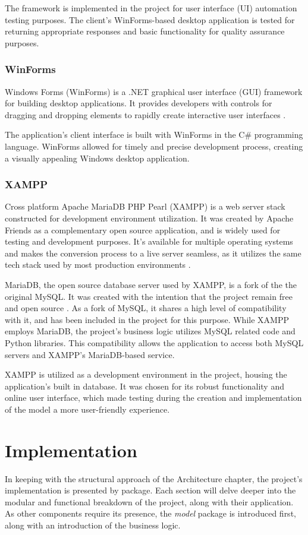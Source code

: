 \documentclass{thesis-ekf}
\theoremstyle{definition}
\theoremstyle{remark}
\begin{document}
The framework is implemented in the project for user interface (UI) automation testing purposes. The client's WinForms-based desktop application is tested for returning appropriate responses and basic functionality for quality assurance purposes.

\subsection{WinForms} \label{winform}
Windows Forms (WinForms) is a .NET graphical user interface (GUI) framework for building desktop applications. It provides developers with controls for dragging and dropping elements to rapidly create interactive user interfaces \cite{winforms}.

The application's client interface is built with WinForms in the C\# programming language. WinForms allowed for timely and precise development process, creating a visually appealing Windows desktop application.

\subsection{XAMPP}
Cross platform Apache MariaDB PHP Pearl (XAMPP) is a web server stack constructed for development environment utilization. It was created by Apache Friends as a complementary open source application, and is widely used for testing and development purposes. It's available for multiple operating systems and makes the conversion process to a live server seamless, as it utilizes the same tech stack used by most production environments \cite{wiki-xampp}.

MariaDB, the open source database server used by XAMPP, is a fork of the the original MySQL. It was created with the intention that the project remain free and open source \cite{mariaDB}. As a fork of MySQL, it shares a high level of compatibility with it, and has been included in the project for this purpose. While XAMPP employs MariaDB, the project's business logic utilizes MySQL related code and Python libraries. This compatibility allows the application to access both MySQL servers and XAMPP's MariaDB-based service.

XAMPP is utilized as a development environment in the project, housing the application's built in database. It was chosen for its robust functionality and online user interface, which made testing during the creation and implementation of the model a more user-friendly experience. 


\chapter{Implementation}
In keeping with the structural approach of the Architecture chapter, the project's implementation is presented by package. Each section will delve deeper into the modular and functional breakdown of the project, along with their application. As other components require its presence, the \emph{model} package is introduced first, along with an introduction of the business logic.
\end{document}
